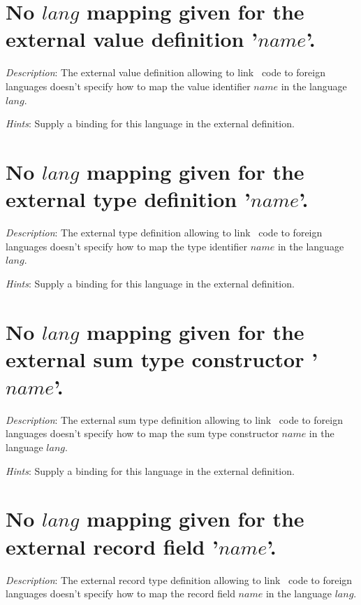 \section*{No $lang$ mapping given for the external value definition
  '$name$'.}

{\em Description}: The external value definition allowing to link
\focal\ code to foreign languages doesn't specify how to map the value
identifier $name$ in the language $lang$.

{\em Hints}: Supply a binding for this language in the external
definition.



\section*{No $lang$ mapping given for the external type definition
  '$name$'.}

{\em Description}: The external type definition allowing to link
\focal\ code to foreign languages doesn't specify how to map the type
identifier $name$ in the language $lang$.

{\em Hints}: Supply a binding for this language in the external
definition.



\section*{No $lang$ mapping given for the external sum type
  constructor '$name$'.}

{\em Description}: The external sum type definition allowing to link
\focal\ code to foreign languages doesn't specify how to map the sum
type constructor $name$ in the language $lang$.

{\em Hints}: Supply a binding for this language in the external
definition.



\section*{No $lang$ mapping given for the external record field
  '$name$'.}

{\em Description}: The external record type definition allowing to
link \focal\ code to foreign languages doesn't specify how to map the
record field $name$ in the language $lang$.

